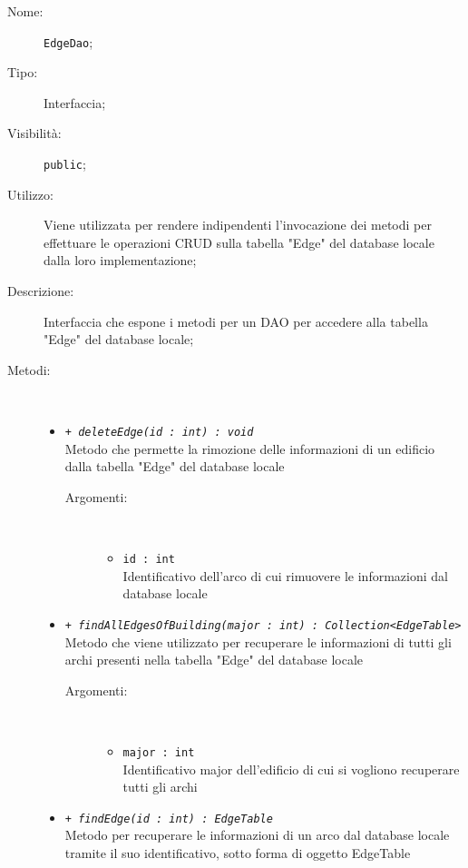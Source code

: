 \documentclass[../DefinizioneDiProdotto.tex]{subfiles}
\begin{document}
\begin{description}
	\item[Nome:] \texttt{EdgeDao};
	\item[Tipo:] Interfaccia;
	\item[Visibilità:] \texttt{public};
	\item[Utilizzo:] Viene utilizzata per rendere indipendenti l'invocazione dei metodi per effettuare le operazioni CRUD sulla tabella "Edge" del database locale dalla loro implementazione;
	\item[Descrizione:] Interfaccia che espone i metodi per un DAO per accedere alla tabella "Edge" del database locale;
	\item[Metodi:] \
	\begin{itemize}
		\item \texttt{+ \textit{deleteEdge(id : int) : void}}\\
		Metodo che permette la rimozione delle informazioni di un edificio dalla tabella "Edge" del database locale 
		\begin{description}
			\item[Argomenti:] \
			\begin{itemize}
				\item \texttt{id : int}\\
				Identificativo dell'arco di cui rimuovere le informazioni dal database locale\end{itemize}
		\end{description}
		\item \texttt{+ \textit{findAllEdgesOfBuilding(major : int) : Collection<EdgeTable>}}\\
		Metodo che viene utilizzato per recuperare le informazioni di tutti gli archi presenti nella tabella "Edge" del database locale
		\begin{description}
			\item[Argomenti:] \
			\begin{itemize}
				\item \texttt{major : int}\\
				Identificativo major dell'edificio di cui si vogliono recuperare tutti gli archi\end{itemize}
		\end{description}
		\item \texttt{+ \textit{findEdge(id : int) : EdgeTable}}\\
		Metodo per recuperare le informazioni di un arco dal database locale tramite il suo identificativo, sotto forma di oggetto EdgeTable
		\begin{description}

\end{description}
\end{itemize}
\end{description}
\end{document}
